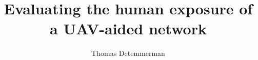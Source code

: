 \documentclass[11pt,a4paper,twoside, openany]{book}
\title{Evaluating the human exposure of a UAV-aided network}
\author{Thomas Detemmerman}
\begin{document}
\tableofcontents                      %
\listoffigures                        %
\listoftables                         %

\printglossaries

%
%





%
\end{document}
